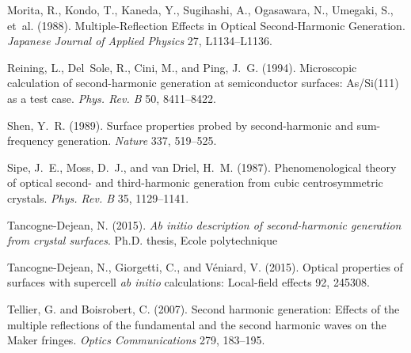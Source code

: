 \documentclass[utf8]{frontiersSCNS}
\begin{document}
\begin{thebibliography}{40}
Morita, R., Kondo, T., Kaneda, Y., Sugihashi, A., Ogasawara, N., Umegaki, S.,
  et~al. (1988).
\newblock Multiple-{Reflection} {Effects} in {Optical} {Second}-{Harmonic}
  {Generation}.
\newblock \emph{Japanese Journal of Applied Physics} 27, L1134--L1136.
\newblock {}

Reining, L., Del~Sole, R., Cini, M., and Ping, J.~G. (1994).
\newblock Microscopic calculation of second-harmonic generation at
  semiconductor surfaces: {As/Si(111)} as a test case.
\newblock \emph{Phys. Rev. B} 50, 8411--8422.
\newblock {}

Shen, Y.~R. (1989).
\newblock Surface properties probed by second-harmonic and sum-frequency
  generation.
\newblock \emph{Nature} 337, 519--525.
\newblock {}

Sipe, J.~E., Moss, D.~J., and van Driel, H.~M. (1987).
\newblock Phenomenological theory of optical second- and third-harmonic
  generation from cubic centrosymmetric crystals.
\newblock \emph{Phys. Rev. B} 35, 1129--1141.
\newblock {}

Tancogne-Dejean, N. (2015).
\newblock \emph{{Ab initio description of second-harmonic generation from
  crystal surfaces}}.
\newblock Ph.D. thesis, {Ecole polytechnique}

Tancogne-Dejean, N., Giorgetti, C., and V{\'e}niard, V. (2015).
\newblock Optical properties of surfaces with supercell {\emph{ab initio}}
  calculations: Local-field effects 92, 245308.
\newblock {}

Tellier, G. and Boisrobert, C. (2007).
\newblock Second harmonic generation: {Effects} of the multiple reflections of
  the fundamental and the second harmonic waves on the {Maker} fringes.
\newblock \emph{Optics Communications} 279, 183--195.
\newblock {}


\end{thebibliography}
\end{document}

